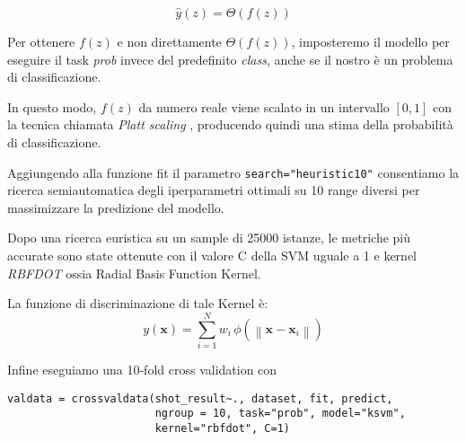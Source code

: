 $$\hat{y}(z) = \Theta(f(z))$$

Per ottenere $f(z)$ e non direttamente $\Theta(f(z))$, imposteremo il modello per eseguire il task \textit{prob} invece del predefinito \textit{class}, anche se il nostro è un problema di classificazione.

In questo modo, $f(z)$ da numero reale viene scalato in un intervallo $[0, 1]$ con la tecnica chiamata \textit{Platt scaling} \cite{Platt99probabilisticoutputs}, producendo quindi una stima della probabilità di classificazione.
\par
Aggiungendo alla funzione fit il parametro \texttt{search="heuristic10"} consentiamo la ricerca semiautomatica degli iperparametri ottimali su 10 range diversi per massimizzare la predizione del modello.
\par
Dopo una ricerca euristica su un sample di 25000 istanze, le metriche più accurate sono state ottenute con il valore C della SVM uguale a 1 e kernel \textit{RBFDOT} ossia Radial Basis Function Kernel.
\par
La funzione di discriminazione di tale Kernel è:
\begin{equation}
y\left(\mathbf{x}\right) = \sum_{i=1}^N w_i \, \phi\left(\left\|\mathbf{x} - \mathbf{x}_i\right\|\right)\label{RBFK}
\end{equation}

Infine eseguiamo una 10-fold cross validation con

\begin{verbatim}
valdata = crossvaldata(shot_result~., dataset, fit, predict,
                       ngroup = 10, task="prob", model="ksvm",
                       kernel="rbfdot", C=1)
\end{verbatim}
